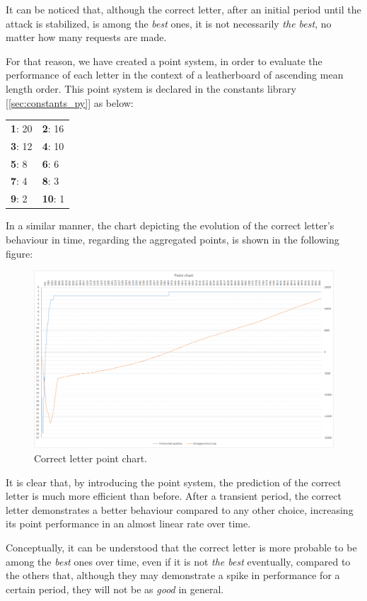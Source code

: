 It can be noticed that, although the correct letter, after an initial period
until the attack is stabilized, is among the \textit{best} ones, it is not
necessarily \textit{the best}, no matter how many requests are made.

For that reason, we have created a point system, in order to evaluate the
performance of each letter in the context of a leatherboard of ascending mean
length order. This point system is declared in the constants library
[\ref{sec:constants_py}] as below:

\begin{table}[H] \centering \begin{tabular} { | l | l | } \hline \textbf{1}: 20
& \textbf{2}: 16 \\ \textbf{3}: 12 & \textbf{4}: 10 \\ \textbf{5}: 8 &
\textbf{6}: 6 \\ \textbf{7}: 4 & \textbf{8}: 3 \\ \textbf{9}: 2 & \textbf{10}: 1
\\ \hline \end{tabular} \end{table}

In a similar manner, the chart depicting the evolution of the correct letter's
behaviour in time, regarding the aggregated points, is shown in the following
figure:

\begin{figure}[H] \caption{Correct letter point chart.}
\includegraphics[width=1\textwidth]{diagrams/point_system_chart_2.png}\end{figure}

It is clear that, by introducing the point system, the prediction of the correct
letter is much more efficient than before. After a transient period, the correct
letter demonstrates a better behaviour compared to any other choice, increasing
its point performance in an almost linear rate over time.

Conceptually, it can be understood that the correct letter is more probable to
be among the \textit{best} ones over time, even if it is not \textit{the best}
eventually, compared to the others that, although they may demonstrate a spike
in performance for a certain period, they will not be as \textit{good} in
general.
